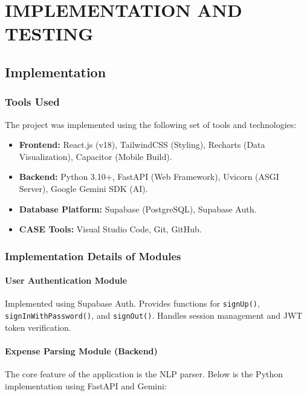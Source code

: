 \chapter{IMPLEMENTATION AND TESTING}

\section{Implementation}

\subsection{Tools Used}
The project was implemented using the following set of tools and technologies:

\begin{itemize}
    \item \textbf{Frontend:} React.js (v18), TailwindCSS (Styling), Recharts (Data Visualization), Capacitor (Mobile Build).
    \item \textbf{Backend:} Python 3.10+, FastAPI (Web Framework), Uvicorn (ASGI Server), Google Gemini SDK (AI).
    \item \textbf{Database Platform:} Supabase (PostgreSQL), Supabase Auth.
    \item \textbf{CASE Tools:} Visual Studio Code, Git, GitHub.
\end{itemize}

\subsection{Implementation Details of Modules}

\subsubsection{User Authentication Module}
Implemented using Supabase Auth. Provides functions for \texttt{signUp()}, \texttt{signInWithPassword()}, and \texttt{signOut()}. Handles session management and JWT token verification.

\subsubsection{Expense Parsing Module (Backend)}
The core feature of the application is the NLP parser. Below is the Python implementation using FastAPI and Gemini:


